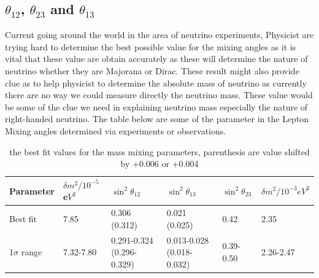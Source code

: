 \documentclass[11pt ,a4paper]{article}
\begin{document}
\subsection*{\(\theta_{12} \), \(\theta_{23} \) and \(\theta_{13} \)}
Current going around the world in the area of neutrino experiments, Physicist are trying hard to determine the best possible value for the mixing angles as it is vital that these value are obtain accurately as these will determine the nature of neutrino whether they are Majorana or Dirac. These result might also provide clue as to help physicist to determine the absolute mass of neutrino as currently there are no way we could measure directly the neutrino mass. These value would be some of the clue we need in explaining neutrino mass especially the nature of right-handed neutrino. The table below are some of the parameter in the Lepton Mixing angles determined via experiments or observations. \cite{theta130}
\begin{table}[htdp]
\begin{center}
\begin{tabular}{|p{2cm}|p{2.2cm}|p{2.3cm}|p{2.3cm}|p{2.3cm}|p{2.3cm}|}
\hline
Parameter & \(\delta m^2/10^{-5} \)e\(V^2 \) & \(\sin^2\theta_{12}\)& \(\sin^2\theta_{13}\)& \(\sin^2\theta_{23}\)&\(\delta m^2/10^{-3} eV^2 \)\\ \hline
Best fit & 7.85 & 0.306 (0.312) & 0.021 (0.025) & 0.42 & 2.35\\ \hline
1\(\sigma \) range & 7.32-7.80 & 0.291-0.324 (0.296-0.329) & 0.013-0.028 (0.018-0.032) & 0.39-0.50 & 2.26-2.47 \\ \hline
\end{tabular}
\end{center}
\label{default}
\caption{the best fit values for the mass mixing parameters, parenthesis are value shifted by +0.006 or +0.004 \cite{theta130}}
\end{table}%
\end{document}
